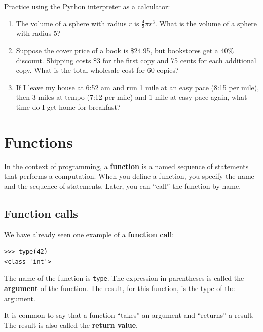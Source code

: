 \documentclass[10pt]{book}
\begin{document}
\begin{exercise}

Practice using the Python interpreter as a calculator: 

\begin{enumerate}

\item The volume of a sphere with radius $r$ is $\frac{4}{3} \pi r^3$.
  What is the volume of a sphere with radius 5?

\item Suppose the cover price of a book is \$24.95, but bookstores get a
  40\% discount.  Shipping costs \$3 for the first copy and 75 cents
  for each additional copy.  What is the total wholesale cost for
  60 copies?

\item If I leave my house at 6:52 am and run 1 mile at an easy pace
  (8:15 per mile), then 3 miles at tempo (7:12 per mile) and 1 mile at
  easy pace again, what time do I get home for breakfast?

\end{enumerate}
\end{exercise}


\chapter{Functions}
\label{funcchap}

In the context of programming, a {\bf function} is a named sequence of
statements that performs a computation.  When you define a function,
you specify the name and the sequence of statements.  Later, you can
``call'' the function by name.  

\section{Function calls}
\label{functionchap}

We have already seen one example of a {\bf function call}:

\begin{verbatim}
>>> type(42)
<class 'int'>
\end{verbatim}
%
The name of the function is {\tt type}.  The expression in parentheses
is called the {\bf argument} of the function.  The result, for this
function, is the type of the argument.

It is common to say that a function ``takes'' an argument and ``returns''
a result.  The result is also called the {\bf return value}.
\end{document}
